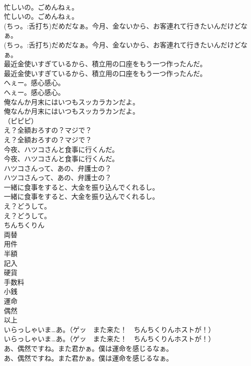 \documentclass[8pt]{extreport}
\begin{document}
\begin{CJK}{UTF8}{min}
\\	忙しいの。ごめんねぇ。	
\\	忙しいの。ごめんねぇ。 
\\	(ちっ。:舌打ち)だめだなぁ。今月、金ないから、お客連れて行きたいんだけどなぁ。	
\\	(ちっ。:舌打ち)だめだなぁ。今月、金ないから、お客連れて行きたいんだけどなぁ。 
\\	最近金使いすぎているから、積立用の口座をもう一つ作ったんだ。	
\\	最近金使いすぎているから、積立用の口座をもう一つ作ったんだ。 
\\	へぇー。感心感心。	
\\	へぇー。感心感心。 
\\	俺なんか月末にはいつもスッカラカンだよ。	
\\	俺なんか月末にはいつもスッカラカンだよ。 
\\	（ピピピ）	
\\	え？全額おろすの？マジで？	
\\	え？全額おろすの？マジで？ 
\\	今夜、ハツコさんと食事に行くんだ。	
\\	今夜、ハツコさんと食事に行くんだ。 
\\	ハツコさんって、あの、弁護士の？	
\\	ハツコさんって、あの、弁護士の？ 
\\	一緒に食事をすると、大金を振り込んでくれるし。	
\\	一緒に食事をすると、大金を振り込んでくれるし。 
\\	え？どうして。	
\\	え？どうして。 
\\	ちんちくりん
\\	両替
\\	用件
\\	半額
\\	記入
\\	硬貨
\\	手数料
\\	小銭
\\	運命
\\	偶然
\\	以上
\\	いらっしゃいま…あ。（ゲッ　また来た！　ちんちくりんホストが！）	
\\	いらっしゃいま…あ。（ゲッ　また来た！　ちんちくりんホストが！） 
\\	あ、偶然ですね。また君かぁ。僕は運命を感じるなぁ。	
\\	あ、偶然ですね。また君かぁ。僕は運命を感じるなぁ。 

\end{CJK}
\end{document}
